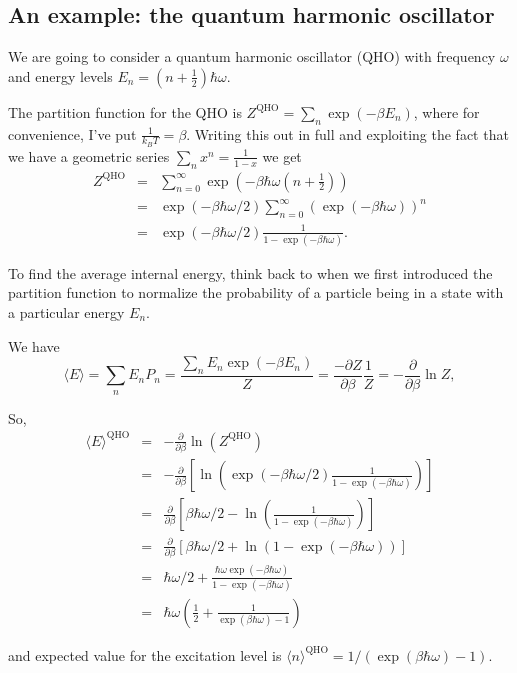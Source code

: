 \documentclass{article}
\begin{document}
\subsection{An example: the quantum harmonic oscillator}
We are going to consider a quantum harmonic oscillator (QHO) with frequency $\omega$ and energy levels $E_n = (n+\frac12)\hbar\omega$.

The partition function for the QHO is $Z^\text{QHO} = \sum_n\exp(-\beta E_n)$, where for convenience, I've put $\frac{1}{k_BT} = \beta$. Writing this out in full and exploiting the fact that we have a geometric series $\sum_n x^n = \frac{1}{1-x}$ we get
\begin{eqnarray*}
	Z^\text{QHO} &=& \sum_{n=0}^\infty \exp(-\beta\hbar\omega(n+\frac12))\\
	&=& \exp(-\beta\hbar\omega/2)\sum_{n=0}^\infty(\exp(-\beta\hbar\omega))^n \\
	&=& \exp(-\beta\hbar\omega/2)\frac{1}{1-\exp(-\beta\hbar\omega)}.
\end{eqnarray*}

To find the average internal energy, think back to when we first introduced the partition function to normalize the probability of a particle being in a state with a particular energy $E_n$.

We have
$$
	\langle E\rangle = \sum_n E_n P_n = \frac{\sum_n E_n \exp(-\beta E_n)}{Z} = \frac{-\partial Z}{\partial \beta}\frac{1}{Z} = -\frac{\partial}{\partial \beta}\ln{Z},
$$

So,
\begin{eqnarray*}
	\langle E\rangle^\text{QHO} &=& -\frac{\partial}{\partial \beta}\ln(Z^\text{QHO})\\
	&=&  -\frac{\partial}{\partial\beta} \left[\ln\left( \exp(-\beta\hbar\omega/2)\frac{1}{1-\exp(-\beta\hbar\omega)}\right) \right] \\
	&=& \frac{\partial}{\partial \beta} \left[ \beta\hbar\omega/2 - \ln\left(\frac{1}{1-\exp(-\beta\hbar\omega)}\right)\right]\\
	&=& \frac{\partial}{\partial \beta} \left[ \beta\hbar\omega/2 + \ln\left({1-\exp(-\beta\hbar\omega)}\right)\right]\\
	&=& \hbar\omega/2 + \frac{\hbar\omega\exp(-\beta\hbar\omega)}{1-\exp(-\beta\hbar\omega)}\\
	&=& \hbar\omega\left(\frac12 +\frac{1}{\exp(\beta\hbar\omega)-1}\right)
\end{eqnarray*}

and expected value for the excitation level is $\langle n\rangle^\text{QHO} = 1/(\exp(\beta\hbar\omega)-1)$.
\end{document}
